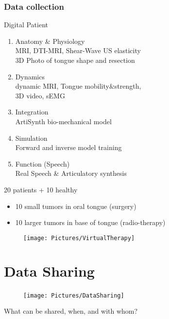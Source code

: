 \documentclass[xcolor=dvipsnames]{beamer}
\begin{document}
\begin{frame}
	\frametitle{Data collection}

	\noindent
	\begin{minipage}[t]{0.50\linewidth}
		Digital Patient
	  	\begin{enumerate}[1]
	  	\item Anatomy \& Physiology\\
				{\footnotesize MRI, DTI-MRI, Shear-Wave US elasticity\\
				3D Photo of tongue shape and resection}
	  	\item Dynamics\\
				{\footnotesize dynamic MRI, Tongue mobility\&strength, \\
				3D video, sEMG}
	  	\item Integration\\
				{\footnotesize ArtiSynth bio-mechanical model}
	  	\item Simulation\\
				{\footnotesize Forward and inverse model training}
	  	\item Function (Speech)\\
				{\footnotesize Real Speech \& Articulatory synthesis}
	  	\end{enumerate}
	
	\end{minipage}
	\hfill%
	\begin{minipage}[t]{0.45\linewidth}
			20 patients + 10 healthy
			\begin{itemize}
			\item 10 small tumors in oral tongue (surgery)
			\item 10 larger tumors in base of tongue (radio-therapy) 
			\end{itemize}
		
			\begin{figure}
			\texttt{[image: Pictures/VirtualTherapy]}
			\end{figure}
	\end{minipage}

\end{frame}

\section{Data Sharing}

\begin{frame}
	\frametitle{\insertsection}
		
	\begin{center}
	\begin{figure}[l]
     \texttt{[image: Pictures/DataSharing]}
	\end{figure}
	{\large What can be shared, when, and with whom?}
	\end{center}
\end{frame}
\end{document}
